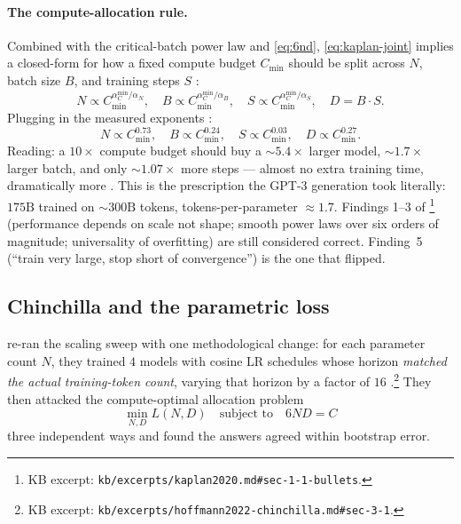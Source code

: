 \paragraph{The compute-allocation rule.}
Combined with the critical-batch power law and \cref{eq:6nd},
\cref{eq:kaplan-joint} implies a closed-form for how a fixed compute
budget $C_{\min}$ should be split across $N$, batch size $B$, and
training steps $S$ \citep[\S 1.2, eqs.\ 1.7--1.8]{kaplan2020}:
\begin{equation}
N \propto C_{\min}^{\alpha_C^{\min}/\alpha_N}, \quad
B \propto C_{\min}^{\alpha_C^{\min}/\alpha_B}, \quad
S \propto C_{\min}^{\alpha_C^{\min}/\alpha_S}, \quad
D = B \cdot S.
\label{eq:kaplan-alloc}
\tag{1.7}
\end{equation}
Plugging in the measured exponents \citep[\S 1.2]{kaplan2020}:
\begin{equation}
N \propto C_{\min}^{0.73}, \quad
B \propto C_{\min}^{0.24}, \quad
S \propto C_{\min}^{0.03}, \quad
D \propto C_{\min}^{0.27}.
\label{eq:kaplan-073}
\end{equation}
Reading: a $10\times$ compute budget should buy a $\sim 5.4\times$
larger model, $\sim 1.7\times$ larger batch, and only $\sim 1.07\times$
more steps --- almost no extra training time, dramatically more
. This is the prescription the GPT-3 generation took
literally: $175\text{B}$  trained on $\sim 300\text{B}$
tokens, tokens-per-parameter $\approx 1.7$. Findings 1--3 of
\citet[\S 1.1]{kaplan2020}\footnote{KB excerpt:
\nolinkurl{kb/excerpts/kaplan2020.md#sec-1-1-bullets}.} (performance
depends on scale not shape; smooth power laws over six orders of
magnitude; universality of overfitting) are still considered correct.
Finding~5 (``train very large, stop short of convergence'') is the one
that flipped.

\subsection{Chinchilla and the parametric loss}
\label{sec:scaling-chinchilla}

\citet{hoffmann2022-chinchilla} re-ran the scaling sweep with one
methodological change: for each parameter count $N$, they trained $4$
models with cosine LR schedules whose horizon \emph{matched the actual
training-token count}, varying that horizon by a factor of $16$
\citep[\S 3.1]{hoffmann2022-chinchilla}.\footnote{KB excerpt:
\nolinkurl{kb/excerpts/hoffmann2022-chinchilla.md#sec-3-1}.} They then
attacked the compute-optimal allocation problem
\begin{equation}
\min_{N, D} L(N, D) \quad \text{subject to} \quad 6 N D = C
\label{eq:cc-problem}
\end{equation}
three independent ways and found the answers agreed within bootstrap
error.

